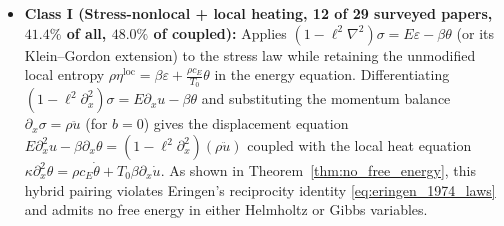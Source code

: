 \begin{itemize}[leftmargin=*]
  \item \textbf{Class I (Stress-nonlocal + local heating, 12 of 29 surveyed papers, $41.4\%$ of all, $48.0\%$ of coupled):} Applies $(1-\ell^2\nabla^2)\sigma = E\varepsilon - \beta\theta$ (or its Klein--Gordon extension) to the stress law while retaining the unmodified local entropy $\rho\eta^{\mathrm{loc}} = \beta\varepsilon + \frac{\rho c_E}{T_0}\theta$ in the energy equation. Differentiating $(1-\ell^2\partial_x^2)\sigma = E\partial_x u - \beta\theta$ and substituting the momentum balance $\partial_x\sigma = \rho\ddot{u}$ (for $b=0$) gives the displacement equation $E\partial_x^2 u - \beta\partial_x\theta = (1-\ell^2\partial_x^2)(\rho\ddot{u})$ coupled with the local heat equation $\kappa\partial_x^2\theta = \rho c_E\dot{\theta} + T_0\beta\partial_x\dot{u}$. As shown in Theorem~\ref{thm:no_free_energy}, this hybrid pairing violates Eringen's \cite{Eringen1974} reciprocity identity \eqref{eq:eringen_1974_laws} and admits no free energy in either Helmholtz or Gibbs variables.


\end{itemize}
